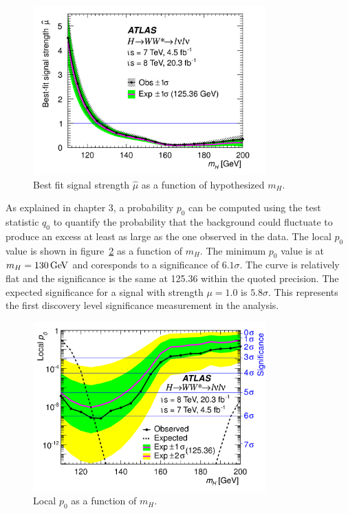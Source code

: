 \begin{figure}[h!]
  \centering
  \captionsetup{justification=centering}

  \includegraphics[width=0.8\textwidth]{figures/mu_mass}
  \caption{Best fit signal strength $\hat{\mu}$ as a function of hypothesized $m_{H}$\cite{WW2015}.}
  \label{fig:mu-val}
\end{figure}

As explained in chapter 3, a probability $p_0$ can be computed using the test statistic $q_0$ to quantify the probability that the background could fluctuate to produce an excess at least as large as the one observed in the data. The local $p_0$ value is shown in figure~\ref{fig:p0} as a function of $m_H$. The minimum $p_0$ value is at $m_H = 130 \GeV$ and coresponds to a significance of $6.1\sigma$. The curve is relatively flat and the significance is the same at 125.36 \GeV within the quoted precision. The expected significance for a signal with strength $\mu = 1.0$ is $5.8\sigma$. This represents the first discovery level significance measurement in the \HWWfull analysis. 

\begin{figure}[h!]
  \centering
  \captionsetup{justification=centering}

  \includegraphics[width=0.8\textwidth]{figures/WW_p0}
  \caption{Local $p_0$ as a function of $m_H$\cite{WW2015}.}
  \label{fig:p0}
\end{figure}


